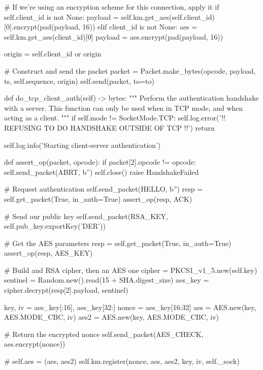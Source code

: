 \begin{pythoncode}
        # If we're using an encryption scheme for this connection, apply it
        if self.client_id is not None:
            payload = self.km.get_aes(self.client_id)[0].encrypt(pad(payload, 16))
        elif client_id is not None:
            aes = self.km.get_aes(client_id)[0]
            payload = aes.encrypt(pad(payload, 16))

        origin = self.client_id or origin

        # Construct and send the packet
        packet = Packet.make_bytes(opcode, payload, ts, self.sequence, origin)
        self.send(packet, to=to)

    def do_tcp_client_auth(self) -> bytes:
        """
        Perform the authentication handshake with a server.
        This function can only be used when in TCP mode, and when acting as a
        client.
        """
        if self.mode != SocketMode.TCP:
            self.log.error('!! REFUSING TO DO HANDSHAKE OUTSIDE OF TCP !!')
            return

        self.log.info('Starting client-server authentication')

        def assert_op(packet, opcode):
            if packet[2].opcode != opcode:
                self.send_packet(ABRT, b'')
                self.close()
                raise HandshakeFailed

        # Request authentication
        self.send_packet(HELLO, b'')
        resp = self.get_packet(True, in_auth=True)
        assert_op(resp, ACK)

        # Send our public key
        self.send_packet(RSA_KEY, self.pub_key.exportKey('DER'))

        # Get the AES parameters
        resp = self.get_packet(True, in_auth=True)
        assert_op(resp, AES_KEY)

        # Build and RSA cipher, then an AES one
        cipher = PKCS1_v1_5.new(self.key)
        sentinel = Random.new().read(15 + SHA.digest_size)
        aes_key = cipher.decrypt(resp[2].payload, sentinel)

        key, iv = aes_key[:16], aes_key[32:]
        nonce = aes_key[16:32]
        aes = AES.new(key, AES.MODE_CBC, iv)
        aes2 = AES.new(key, AES.MODE_CBC, iv)

        # Return the encrypted nonce
        self.send_packet(AES_CHECK, aes.encrypt(nonce))

        # self.aes = (aes, aes2)
        self.km.register(nonce, aes, aes2, key, iv, self._sock)


\end{pythoncode}

